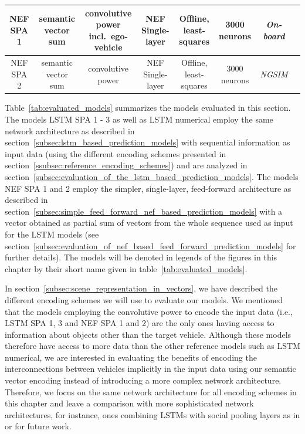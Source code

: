 \begin{center}
{\begin{tabular}{cccccccc}
            \midrule
            \acs{NEF} \acs{SPA} \num{1} & semantic vector sum & \makecell{convolutive power \\ incl.\ ego-vehicle} & \acs{NEF} Single-layer & \makecell{Offline, \\ least-squares} & \num{3000} neurons  &\emph{On-board} \\ 
            \midrule
            \acs{NEF} \acs{SPA} \num{2} & semantic vector sum & convolutive power & \acs{NEF} Single-layer & \makecell{Offline, \\ least-squares} & \num{3000} neurons &\emph{\ac{NGSIM}}\\ 
            \bottomrule
        \end{tabular}
    }
	\label{tab:evaluated_models}
\end{center}

Table~\ref{tab:evaluated_models} summarizes the models evaluated in this section.
The models \ac{LSTM} \ac{SPA} \num{1} - \num{3} as well as \ac{LSTM} numerical employ the same network architecture as described in section~\ref{subsec:lstm_based_prediction_models} with sequential information as input data (using the different encoding schemes presented in section~\ref{ssubsec:reference_encoding_schemes}) and are analyzed in section~\ref{subsec:evaluation_of_the_lstm_based_prediction_models}.
The models \ac{NEF} \ac{SPA} \num{1} and \num{2} employ the simpler, single-layer, feed-forward architecture as described in section~\ref{subsec:simple_feed_forward_nef_based_prediction_models} with a vector obtained as partial sum of vectors from the whole sequence used as input for the \ac{LSTM} models (see section~\ref{subsec:evaluation_of_nef_based_feed_forward_prediction_models} for further details).
The models will be denoted in legends of the figures in this chapter by their short name given in table~\ref{tab:evaluated_models}.

In section~\ref{subsec:scene_representation_in_vectors}, we have described the different encoding schemes we will use to evaluate our models.
We mentioned that the models employing the convolutive power to encode the input data (i.e., \ac{LSTM} \ac{SPA} \num{1}, \num{3} and \ac{NEF} \ac{SPA} \num{1} and \num{2}) are the only ones having access to information about objects other than the target vehicle.
Although these models therefore have access to more data than the other reference models such as \ac{LSTM} numerical, we are interested in evaluating the benefits of encoding the interconnections between vehicles implicitly in the input data using our semantic vector encoding instead of introducing a more complex network architecture.
Therefore, we focus on the same network architecture for all encoding schemes in this chapter and leave a comparison with more sophisticated network architectures, for instance, ones combining \acp{LSTM} with social pooling layers as in \textcite{Deo2018a} or \textcite{Alahi2016} for future work.

